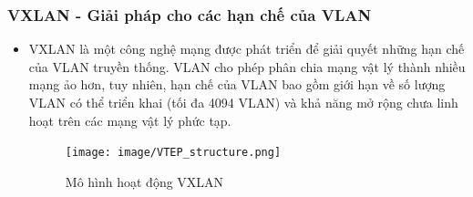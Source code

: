 \documentclass[13pt]{article}
\begin{document}
\subsubsection{VXLAN - Giải pháp cho các hạn chế của VLAN}
\begin{itemize}
    \item VXLAN là một công nghệ mạng được phát triển để giải quyết những hạn chế của VLAN truyền thống. VLAN cho phép phân chia mạng vật lý thành nhiều mạng ảo hơn, tuy nhiên, hạn chế của VLAN bao gồm giới hạn về số lượng VLAN có thể triển khai (tối đa 4094 VLAN) và khả năng mở rộng chưa linh hoạt trên các mạng vật lý phức tạp.

    \begin{figure}[h!]
        \centering
        \texttt{[image: image/VTEP\_structure.png]}
            \caption{Mô hình hoạt động VXLAN}
            \label{fig:label1}
    \end{figure}
    

\end{itemize}
\end{document}
